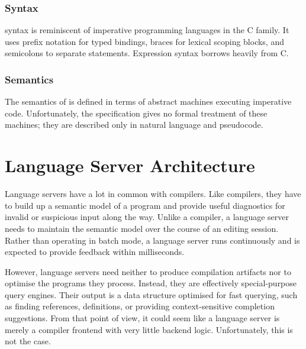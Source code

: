 
\subsection{Syntax}

\pfs syntax is reminiscent of imperative programming languages in the C family.
It uses prefix notation for typed bindings, braces for lexical scoping blocks,
and semicolons to separate statements. Expression syntax borrows heavily from C.

\subsection{Semantics}

The semantics of \pfs is defined in terms of abstract machines executing
imperative code. Unfortunately, the specification gives no formal treatment of
these machines; they are described only in natural language and pseudocode.



\chapter{Language Server Architecture}

Language servers have a lot in common with compilers. Like compilers, they have
to build up a semantic model of a program and provide useful diagnostics for
invalid or suspicious input along the way. Unlike a compiler, a language server
needs to maintain the semantic model over the course of an editing session.
Rather than operating in batch mode, a language server runs continuously and is
expected to provide feedback within milliseconds.

However, language servers need neither to produce compilation artifacts nor to
optimise the programs they process. Instead, they are effectively
special-purpose query engines. Their output is a data structure optimised for
fast querying, such as finding references, definitions, or providing
context-sensitive completion suggestions. From that point of view, it could seem
like a language server is merely a compiler frontend with very little backend logic.
Unfortunately, this is not the case.

